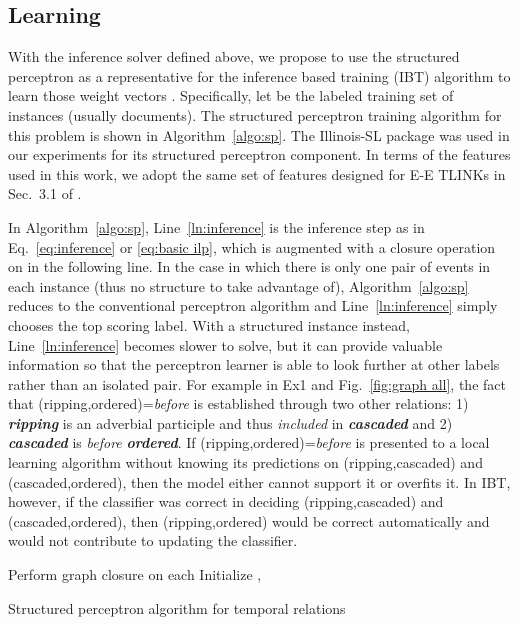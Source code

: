 \documentclass[11pt,letterpaper]{article}
\newcommand{\event}[1]{\textit{\textbf{#1}}}
\newcommand{\rel}[1]{\textit{#1}}
\newcommand{\final}[1]{#1}
\begin{document}
	
\subsection{Learning}
With the inference solver defined above, we propose to use the structured perceptron \citep{collins2002} as a representative for the inference based training (IBT) algorithm to learn those weight vectors .
Specifically, let  be the labeled training set of  instances (usually documents). The structured perceptron training algorithm for this problem is shown in Algorithm~\ref{algo:sp}. The Illinois-SL package \citep{CSGR10} was used in our experiments for its structured perceptron component.
\final{In terms of the features used in this work, we adopt the same set of features designed for E-E TLINKs in Sec.~3.1 of \citet{DoLuRo12}.}
 
In Algorithm~\ref{algo:sp}, Line~\ref{ln:inference} is the inference step as in Eq.~\eqref{eq:inference} or \eqref{eq:basic ilp}, which is augmented with a closure operation on  in the following line.
In the case in which there is only one pair of events in each instance (thus no structure to take advantage of),  Algorithm~\ref{algo:sp} reduces to the conventional perceptron algorithm and Line~\ref{ln:inference} simply chooses the top scoring label.
With a structured instance instead, Line~\ref{ln:inference} becomes slower to solve, but it can provide valuable information so that the perceptron learner is able to look further at other labels rather than an isolated pair. 
For example in Ex1 and Fig.~\ref{fig:graph all}, the fact that ({ripping},{ordered})=\rel{before}  is established through two other relations: 1) \event{ripping} is an adverbial participle and thus \rel{included} in \event{cascaded} and 2) \event{cascaded} is \rel{before} \event{ordered}. If ({ripping},{ordered})=\rel{before} is presented to a local learning algorithm without knowing its predictions on ({ripping},{cascaded}) and ({cascaded},{ordered}), then the model either cannot support it or overfits it. 
In IBT, however, if the classifier was correct in deciding ({ripping},{cascaded}) and ({cascaded},{ordered}), then ({ripping},{ordered}) would be correct automatically and would not contribute to updating the classifier. 

\begin{algorithm}[htbp!]
	\DontPrintSemicolon {}
	Perform graph closure on each \;
	Initialize , \;
	\Return{}\;
	\caption{Structured perceptron algorithm for temporal relations}
	\label{algo:sp}
\end{algorithm}
	
\end{document}
